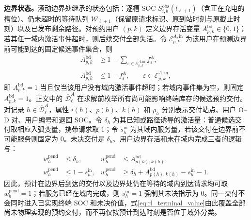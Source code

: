 \documentclass[12pt,a4paper,UTF8]{ctexart}
\begin{document}
\textbf{边界状态。}滚动边界处继承的状态包括：逐槽 SOC $S_{i,b}^{\mathrm{obs}}(t_{\ell+1})$（含正在充电的槽位）、仍未超时的等待队列 $\mathcal W_{\ell+1}$（保留原请求标识、原到站时刻与原截止时刻）以及已发布剩余路径。对预约用户 $(p,k)$ 定义边界存活变量 $A_{p,k}^{\mathrm{bd}}\in\{0,1\}$；若其任一域内激活事件超时，则后续交付全部失活。令 $\mathcal E_{p,k}^{A,\mathrm{in}}$ 为该用户在预测边界前可能到达的固定候选事件集合，则
\begin{subequations}
\label{eq:boundary_alive}
\begin{align}
A_{p,k}^{\mathrm{bd}}
&\ge 1-\sum_{\varepsilon\in\mathcal E_{p,k}^{A,\mathrm{in}}}
f_\varepsilon^A,\\
A_{p,k}^{\mathrm{bd}}
&\le 1-f_\varepsilon^A,
\qquad \varepsilon\in\mathcal E_{p,k}^{A,\mathrm{in}},
\end{align}
\end{subequations}
即 $A_{p,k}^{\mathrm{bd}}=1$ 当且仅当该用户没有域内激活事件超时；若域内事件集为空，则固定 $A_{p,k}^{\mathrm{bd}}=1$。正文中的 $\overline{\mathcal D}_{\ell}^{A}$ 在求解前枚举所有尚可能影响终端库存的候选预约交付。对记录 $h\in\overline{\mathcal D}_{\ell}^{A}$，属性 $i(h)$、$p(h)$、$k(h)$ 和 $\rho_h$ 分别表示交付站点、用户 O--D 对、用户编号和退回 SOC。令 $\delta_h$ 为其已知或路径诱导的激活量：普通候选交付取相应入弧变量，携带请求取 $1$；令 $s_h^{\mathrm{in}}$ 为其域内服务量，若该交付在边界前不可能服务则固定为 $0$。未决交付是 $\delta_h$、用户边界存活和未在域内完成三者的逻辑与：
\begin{subequations}
\label{eq:pending_delivery_alive}
\begin{align}
w_h^{\mathrm{pend}}&\le\delta_h,&
w_h^{\mathrm{pend}}&\le A_{p(h),k(h)}^{\mathrm{bd}},\\
w_h^{\mathrm{pend}}&\le1-s_h^{\mathrm{in}},&
w_h^{\mathrm{pend}}
&\ge\delta_h+A_{p(h),k(h)}^{\mathrm{bd}}
-s_h^{\mathrm{in}}-1.
\end{align}
\end{subequations}
因此，预计在边界后到达的交付以及边界处仍在等待的域内到达请求均可取 $w_h^{\mathrm{pend}}=1$；若服务已经在域内完成，则 $s_h^{\mathrm{in}}=1$ 强制其未决指示为 $0$。同一交付不会同时进入已实现终端 SOC 和未决价值，式\eqref{eq:rl_terminal_value}由此覆盖全部尚未物理实现的预约交付，而不再仅按预计到达时刻是否位于域外分类。
\end{document}
